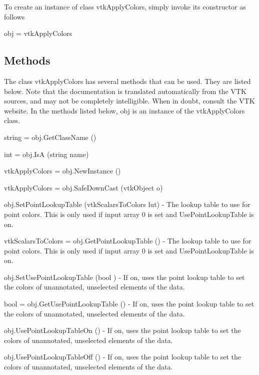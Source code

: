 To create an instance of class vtk\-Apply\-Colors, simply invoke its constructor as follows \begin{DoxyVerb}  obj = vtkApplyColors
\end{DoxyVerb}
 \hypertarget{vtkwidgets_vtkxyplotwidget_Methods}{}\subsection{Methods}\label{vtkwidgets_vtkxyplotwidget_Methods}
The class vtk\-Apply\-Colors has several methods that can be used. They are listed below. Note that the documentation is translated automatically from the V\-T\-K sources, and may not be completely intelligible. When in doubt, consult the V\-T\-K website. In the methods listed below, {\ttfamily obj} is an instance of the vtk\-Apply\-Colors class. 
\begin{DoxyItemize}
\item {\ttfamily string = obj.\-Get\-Class\-Name ()}  
\item {\ttfamily int = obj.\-Is\-A (string name)}  
\item {\ttfamily vtk\-Apply\-Colors = obj.\-New\-Instance ()}  
\item {\ttfamily vtk\-Apply\-Colors = obj.\-Safe\-Down\-Cast (vtk\-Object o)}  
\item {\ttfamily obj.\-Set\-Point\-Lookup\-Table (vtk\-Scalars\-To\-Colors lut)} -\/ The lookup table to use for point colors. This is only used if input array 0 is set and Use\-Point\-Lookup\-Table is on.  
\item {\ttfamily vtk\-Scalars\-To\-Colors = obj.\-Get\-Point\-Lookup\-Table ()} -\/ The lookup table to use for point colors. This is only used if input array 0 is set and Use\-Point\-Lookup\-Table is on.  
\item {\ttfamily obj.\-Set\-Use\-Point\-Lookup\-Table (bool )} -\/ If on, uses the point lookup table to set the colors of unannotated, unselected elements of the data.  
\item {\ttfamily bool = obj.\-Get\-Use\-Point\-Lookup\-Table ()} -\/ If on, uses the point lookup table to set the colors of unannotated, unselected elements of the data.  
\item {\ttfamily obj.\-Use\-Point\-Lookup\-Table\-On ()} -\/ If on, uses the point lookup table to set the colors of unannotated, unselected elements of the data.  
\item {\ttfamily obj.\-Use\-Point\-Lookup\-Table\-Off ()} -\/ If on, uses the point lookup table to set the colors of unannotated, unselected elements of the data.  

\end{DoxyItemize}
